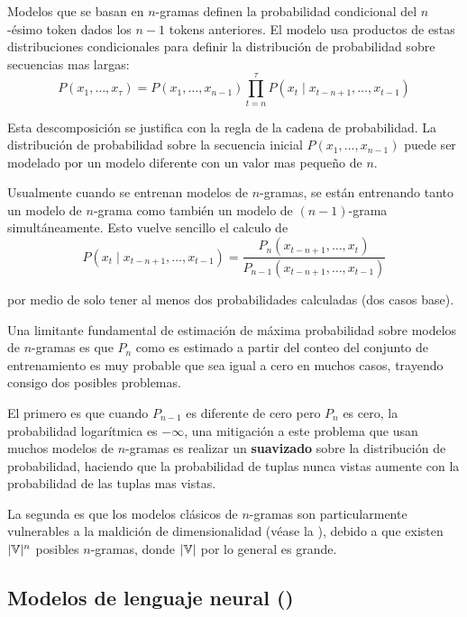 Modelos que se basan en $n$-gramas definen la probabilidad condicional del $n$-ésimo token dados los $n-1$ tokens anteriores. El modelo usa productos de estas distribuciones condicionales para definir la distribución de probabilidad sobre secuencias mas largas:
\begin{equation}
  P(x_1, \ldots, x_\tau) = P(x_1, \ldots, x_{n-1}) \prod_{t = n}^{\tau} P(x_t \mid x_{t-n+1}, \ldots, x_{t-1})
\end{equation}

Esta descomposición se justifica con la regla de la cadena de probabilidad. La distribución de probabilidad sobre la secuencia inicial $P(x_1, \ldots, x_{n-1})$ puede ser modelado por un modelo diferente con un valor mas pequeño de $n$.

Usualmente cuando se entrenan modelos de $n$-gramas, se están entrenando tanto un modelo de $n$-grama como también un modelo de $(n-1)$-grama simultáneamente. Esto vuelve sencillo el calculo de
\begin{equation}
  P(x_t \mid x_{t-n+1}, \ldots, x_{t-1}) = \frac{P_n(x_{t-n+1}, \ldots, x_t)}{P_{n-1}(x_{t-n+1}, \ldots, x_{t-1})}
\end{equation}

por medio de solo tener al menos dos probabilidades calculadas (dos casos base).

Una limitante fundamental de estimación de máxima probabilidad sobre modelos de $n$-gramas es que $P_n$ como es estimado a partir del conteo del conjunto de entrenamiento es muy probable que sea igual a cero en muchos casos, trayendo consigo dos posibles problemas.

El primero es que cuando $P_{n-1}$ es diferente de cero pero $P_n$ es cero, la probabilidad logarítmica es $-\infty$, una mitigación a este problema que usan muchos modelos de $n$-gramas es realizar un \textbf{suavizado} sobre la distribución de probabilidad, haciendo que la probabilidad de tuplas nunca vistas aumente con la probabilidad de las tuplas mas vistas.

La segunda es que los modelos clásicos de $n$-gramas son particularmente vulnerables a la maldición de dimensionalidad (véase la ), debido a que existen $|{\mathbb{V}}|^n$ posibles $n$-gramas, donde $|{\mathbb{V}}|$ por lo general es grande.

\subsection{Modelos de lenguaje neural ()}


